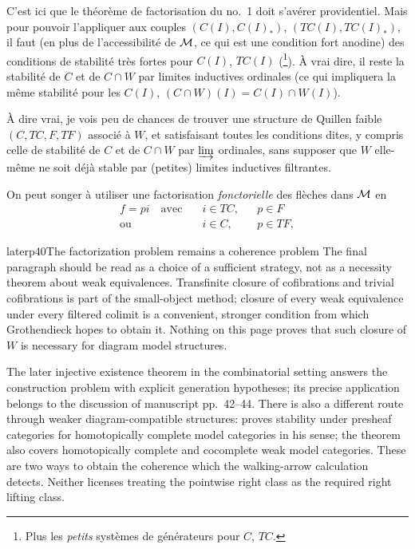 C'est ici que le théorème de factorisation du no.~1 doit s'avérer providentiel. Mais pour pouvoir l'appliquer aux couples $(C(I),C(I)_*)$, $(TC(I),TC(I)_*)$, il faut (en plus de l'accessibilité de $\mathcal{M}$, ce qui est une condition fort anodine) des conditions de stabilité très fortes pour $C(I)$, $TC(I)$ (\footnote{Plus les \textit{petits} systèmes de générateurs pour $C$, $TC$.}). À vrai dire, il reste la stabilité de $C$ et de $C\cap W$ par limites inductives ordinales (ce qui impliquera la même stabilité pour les $C(I)$, $(C{\cap}W)(I) = C(I){\cap}W(I)$).

À dire vrai, je vois peu de chances de trouver une structure de Quillen faible $(C,TC,F,TF)$ associé à $W$, et satisfaisant toutes les conditions dites, y compris celle de stabilité de $C$ et de $C\cap W$ par $\varinjlim$ ordinales, sans supposer que $W$ elle-même ne soit déjà stable par (petites) limites inductives filtrantes. %

On peut songer à utiliser une factorisation \textit{fonctorielle} des flèches dans $\mathcal{M}$ en
\[
\begin{aligned}
f = pi \quad \text{avec}\quad & i\in TC, && p\in F\\
\text{ou}\quad & i\in C, && p\in TF,
\end{aligned}
\]

\begin{dcomment}{later}{p40}{The factorization problem remains a coherence problem}
The final paragraph should be read as a choice of a sufficient strategy, not as a necessity theorem about weak equivalences. Transfinite closure of cofibrations and trivial cofibrations is part of the small-object method; closure of every weak equivalence under every filtered colimit is a convenient, stronger condition from which Grothendieck hopes to obtain it. Nothing on this page proves that such closure of $W$ is necessary for diagram model structures.

The later injective existence theorem in the combinatorial setting answers the construction problem with explicit generation hypotheses; its precise application belongs to the discussion of manuscript pp.~42--44. There is also a different route through weaker diagram-compatible structures: \citet[Theorem~6.22]{Cisinski2010} proves stability under presheaf categories for homotopically complete model categories in his sense; the theorem also covers homotopically complete and cocomplete weak model categories. These are two ways to obtain the coherence which the walking-arrow calculation detects. Neither licenses treating the pointwise right class as the required right lifting class.
\end{dcomment}


